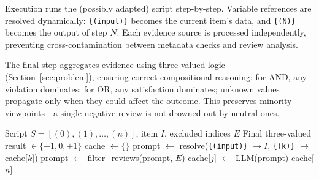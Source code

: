 Execution runs the (possibly adapted) script step-by-step.
Variable references are resolved dynamically: \texttt{\{(input)\}} becomes the current item's data, and \texttt{\{(N)\}} becomes the output of step $N$.
Each evidence source is processed independently, preventing cross-contamination between metadata checks and review analysis.

The final step aggregates evidence using three-valued logic (Section~\ref{sec:problem}), ensuring correct compositional reasoning: for AND, any violation dominates; for OR, any satisfaction dominates; unknown values propagate only when they could affect the outcome.
This preserves minority viewpoints---a single negative review is not drowned out by neutral ones.

\begin{algorithm}[t]
\caption{Script Execution with Caching}
\label{alg:execution}
\begin{algorithmic}[1]
\REQUIRE Script $S = [(0), (1), \ldots, (n)]$, item $I$, excluded indices $E$
\ENSURE Final three-valued result $\in \{-1, 0, +1\}$
\STATE cache $\leftarrow \{\}$
    \STATE prompt $\leftarrow$ resolve(\texttt{\{(input)\}} $\to I$, \texttt{\{(k)\}} $\to$ cache[$k$])
        \STATE prompt $\leftarrow$ filter\_reviews(prompt, $E$)
    \ENDIF
    \STATE cache[$j$] $\leftarrow$ LLM(prompt)
\ENDFOR
\RETURN cache[$n$] 
\end{algorithmic}
\end{algorithm}
